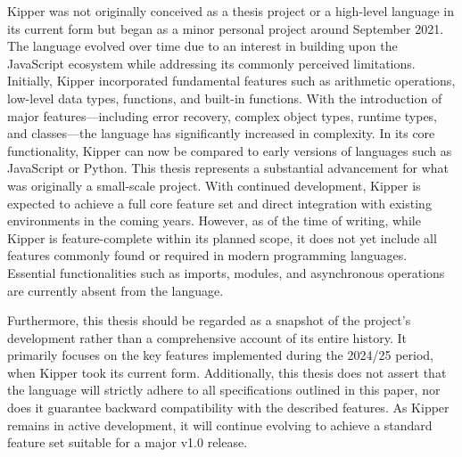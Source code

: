 
Kipper was not originally conceived as a thesis project or a high-level language in its current form but began as a minor personal project around September 2021. The language evolved over time due to an interest in building upon the JavaScript ecosystem while addressing its commonly perceived limitations. Initially, Kipper incorporated fundamental features such as arithmetic operations, low-level data types, functions, and built-in functions. With the introduction of major features—including error recovery, complex object types, runtime types, and classes—the language has significantly increased in complexity. In its core functionality, Kipper can now be compared to early versions of languages such as JavaScript or Python. This thesis represents a substantial advancement for what was originally a small-scale project. With continued development, Kipper is expected to achieve a full core feature set and direct integration with existing environments in the coming years. However, as of the time of writing, while Kipper is feature-complete within its planned scope, it does not yet include all features commonly found or required in modern programming languages. Essential functionalities such as imports, modules, and asynchronous operations are currently absent from the language.

Furthermore, this thesis should be regarded as a snapshot of the project's development rather than a comprehensive account of its entire history. It primarily focuses on the key features implemented during the 2024/25 period, when Kipper took its current form. Additionally, this thesis does not assert that the language will strictly adhere to all specifications outlined in this paper, nor does it guarantee backward compatibility with the described features. As Kipper remains in active development, it will continue evolving to achieve a standard feature set suitable for a major v1.0 release.

